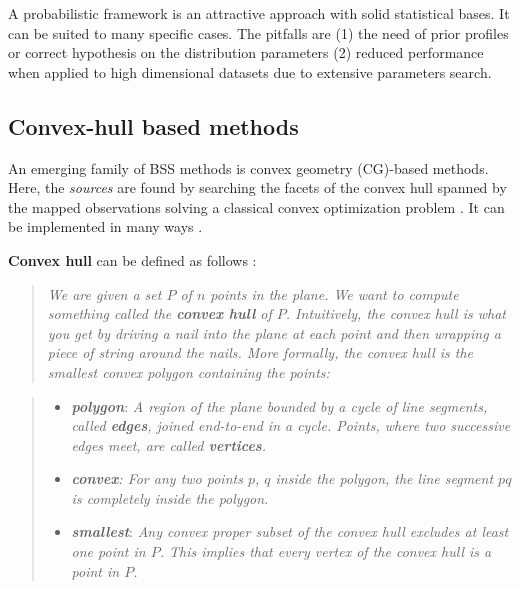 \documentclass[12pt,]{book}
\theoremstyle{definition}
\theoremstyle{definition}
\theoremstyle{definition}
\theoremstyle{remark}
\begin{document}
A probabilistic framework is an attractive approach with solid
statistical bases. It can be suited to many specific cases. The pitfalls
are (1) the need of prior profiles or correct hypothesis on the
distribution parameters (2) reduced performance when applied to high
dimensional datasets due to extensive parameters search.

\hypertarget{convex-hull-based-methods}{%
\subsection{Convex-hull based methods}\label{convex-hull-based-methods}}

An emerging family of BSS methods is convex geometry (CG)-based methods.
Here, the \emph{sources} are found by searching the facets of the convex
hull spanned by the mapped observations solving a classical convex
optimization problem \citep{Yang2015}. It can be implemented in many
ways \citep{Preparata1985}.

\textbf{Convex hull} can be defined as follows \citep{Erickson2018}:

\begin{quote}
\emph{We are given a set \(P\) of \(n\) points in the plane. We want to
compute something called the \textbf{convex hull} of \(P\). Intuitively,
the convex hull is what you get by driving a nail into the plane at each
point and then wrapping a piece of string around the nails. More
formally, the convex hull is the smallest convex polygon containing the
points:}
\end{quote}

\begin{quote}
\begin{itemize}
\item
  \emph{\textbf{polygon}}: \emph{A region of the plane bounded by a
  cycle of line segments, called \textbf{edges}, joined end-to-end in a
  cycle. Points, where two successive edges meet, are called
  \textbf{vertices}.}
\item
  \emph{\textbf{convex}: For any two points \(p\), \(q\) inside the
  polygon, the line segment \(pq\) is completely inside the polygon.}
\item
  \emph{\textbf{smallest}}: \emph{Any convex proper subset of the convex
  hull excludes at least one point in \(P\). This implies that every
  vertex of the convex hull is a point in \(P\).}
\end{itemize}
\end{quote}
\end{document}
